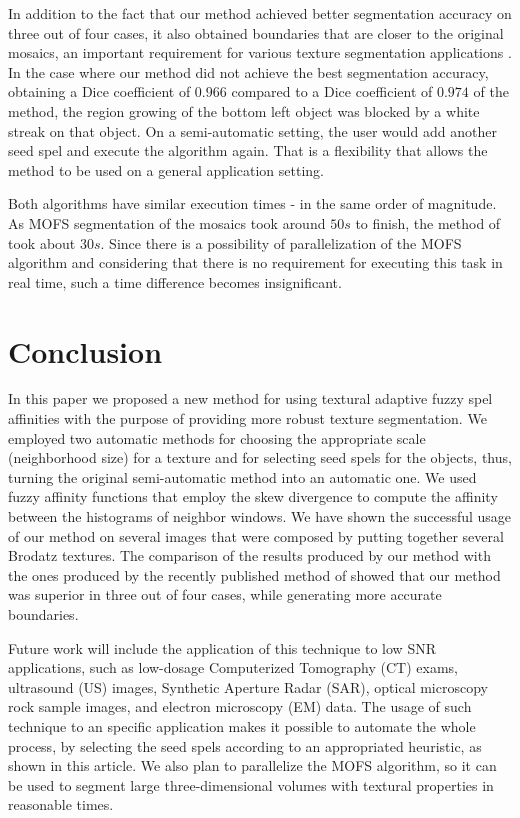 \documentclass[10pt,twocolumn,letterpaper]{article}
\begin{document}
In addition to the fact that our method achieved better segmentation accuracy on three out of four cases, it also obtained boundaries that are closer to the original mosaics, an important requirement for various texture segmentation applications \cite{JOBA06a}. In the case where our method did not achieve the best segmentation accuracy, obtaining a Dice coefficient of $0.966$ compared to a Dice coefficient of $0.974$ of the \cite{YUAN15a} method, the region growing of the bottom left object was blocked by a white streak on that object. On a semi-automatic setting, the user would add another seed spel and execute the algorithm again. That is a flexibility that allows the method to be used on a general application setting.

Both algorithms have similar execution times - in the same order of magnitude. As MOFS segmentation of the mosaics took around $50s$ to finish, the method of \cite{YUAN15a} took about $30s$. Since there is a possibility of parallelization of the MOFS algorithm and considering that there is no requirement for executing this task in real time, such a time difference becomes insignificant.


\section{Conclusion}\label{sec:Conclusion}
%
In this paper we proposed a new method for using textural adaptive fuzzy spel affinities with the purpose of providing more robust texture segmentation. We employed two automatic methods for choosing the appropriate scale (neighborhood size) for a texture and for selecting seed spels for the objects, thus, turning the original semi-automatic method into an automatic one. We used fuzzy affinity functions that employ the skew divergence to compute the affinity between the histograms of neighbor windows. We have shown the successful usage of our method on several images that were composed by putting together several Brodatz textures. The comparison of the results produced by our method with the ones produced by the recently published method of \cite{YUAN15a} showed that our method was superior in three out of four cases, while generating more accurate boundaries.

Future work will include the application of this technique to low SNR applications, such as low-dosage Computerized Tomography (CT) exams, ultrasound (US) images, Synthetic Aperture Radar (SAR), optical microscopy rock sample images, and electron microscopy (EM) data. The usage of such technique to an specific application makes it possible to automate the whole process, by selecting the seed spels according to an appropriated heuristic, as shown in this article. We also plan to parallelize the MOFS algorithm, so it can be used to segment large three-dimensional volumes with textural properties in reasonable times.



{\small


}
\end{document}
